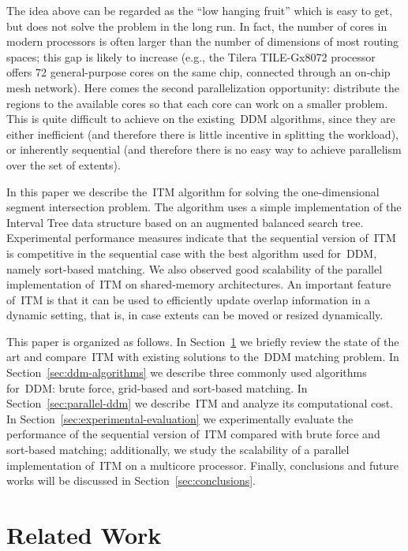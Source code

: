 \documentclass[10pt, conference, compsocconf]{IEEEtran}
\begin{document}
The idea above can be regarded as the ``low hanging fruit'' which is
easy to get, but does not solve the problem in the long run.  In fact,
the number of cores in modern processors is often larger than the
number of dimensions of most routing spaces; this gap is likely to
increase (e.g., the Tilera TILE-Gx8072 processor~\cite{tileragx}
offers 72 general-purpose cores on the same chip, connected through an
on-chip mesh network). Here comes the second parallelization
opportunity: distribute the regions to the available cores so that
each core can work on a smaller problem. This is quite difficult to
achieve on the existing~\ac{DDM} algorithms, since they are either
inefficient (and therefore there is little incentive in splitting the
workload), or inherently sequential (and therefore there is no easy
way to achieve parallelism over the set of extents).

In this paper we describe the~\acf{ITM} algorithm for solving the
one-dimensional segment intersection problem. The algorithm uses a
simple implementation of the Interval Tree data structure based on an
augmented balanced search tree. Experimental performance measures
indicate that the sequential version of~\ac{ITM} is competitive in the
sequential case with the best algorithm used for~\ac{DDM}, namely
sort-based matching. We also observed good scalability of the parallel
implementation of~\ac{ITM} on shared-memory architectures. An
important feature of~\ac{ITM} is that it can be used to efficiently
update overlap information in a dynamic setting, that is, in case
extents can be moved or resized dynamically.

This paper is organized as follows. In Section~\ref{sec:related-work}
we briefly review the state of the art and compare~\ac{ITM} with
existing solutions to the~\ac{DDM} matching problem. In
Section~\ref{sec:ddm-algorithms} we describe three commonly used
algorithms for~\ac{DDM}: brute force, grid-based and sort-based
matching. In Section~\ref{sec:parallel-ddm} we describe~\ac{ITM} and
analyze its computational cost. In
Section~\ref{sec:experimental-evaluation} we experimentally evaluate
the performance of the sequential version of~\ac{ITM} compared with
brute force and sort-based matching; additionally, we study the
scalability of a parallel implementation of~\ac{ITM} on a multicore
processor.  Finally, conclusions and future works will be discussed in
Section~\ref{sec:conclusions}.


\section{Related Work}\label{sec:related-work}
\end{document}
